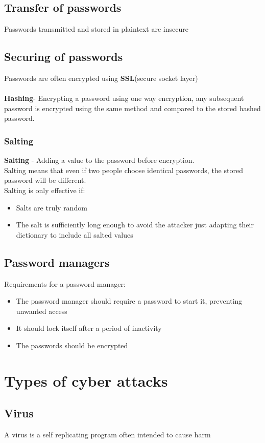 \documentclass{article}[18pt]
\begin{document}
\subsection{Transfer of passwords}
Passwords transmitted and stored in plaintext are insecure
\subsection{Securing of passwords}
Passwords are often encrypted using \textbf{SSL}(secure socket layer)\\
\\
\textbf{Hashing}- Encrypting a password using one way encryption, any subsequent password is encrypted using the same method and compared to the stored hashed password.
\subsubsection{Salting}
\textbf{Salting} - Adding a value to the password before encryption.\\
Salting means that even if two people choose identical passwords, the stored password will be different.\\
Salting is only effective if:
\begin{itemize}
\item Salts are truly random
\item The salt is sufficiently long enough to avoid the attacker just adapting their dictionary to include all salted values
\end{itemize}
\subsection{Password managers}
Requirements for a password manager:
\begin{itemize}
\item The password manager should require a password to start it, preventing unwanted access
\item It should lock itself after a period of inactivity
\item The passwords should be encrypted
\end{itemize}
\section{Types of cyber attacks}
\subsection{Virus}
A virus is a self replicating program often intended to cause harm
\end{document}
